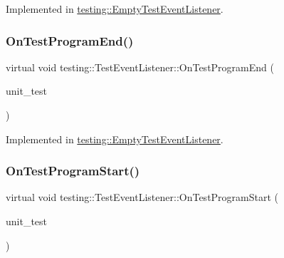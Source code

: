 Implemented in \hyperlink{classtesting_1_1EmptyTestEventListener_ab95992f0a0b3741d59a24c3a7115fa60}{testing\+::\+Empty\+Test\+Event\+Listener}.

\mbox{\label{classtesting_1_1TestEventListener_ad15b6246d94c268e233487a86463ef3d}} 
\subsubsection{\texorpdfstring{On\+Test\+Program\+End()}{OnTestProgramEnd()}}
{\footnotesize\ttfamily virtual void testing\+::\+Test\+Event\+Listener\+::\+On\+Test\+Program\+End (\begin{DoxyParamCaption}\item[{const \hyperlink{classtesting_1_1UnitTest}{Unit\+Test} \&}]{unit\+\_\+test }\end{DoxyParamCaption})\hspace{0.3cm}{\ttfamily [pure virtual]}}



Implemented in \hyperlink{classtesting_1_1EmptyTestEventListener_aaa9d683e8e0c850af67a0b92d785ddb9}{testing\+::\+Empty\+Test\+Event\+Listener}.

\mbox{\label{classtesting_1_1TestEventListener_a5f6c84f39851e8a603a2d2e10063816b}} 
\subsubsection{\texorpdfstring{On\+Test\+Program\+Start()}{OnTestProgramStart()}}
{\footnotesize\ttfamily virtual void testing\+::\+Test\+Event\+Listener\+::\+On\+Test\+Program\+Start (\begin{DoxyParamCaption}\item[{const \hyperlink{classtesting_1_1UnitTest}{Unit\+Test} \&}]{unit\+\_\+test }\end{DoxyParamCaption})\hspace{0.3cm}{\ttfamily [pure virtual]}}



